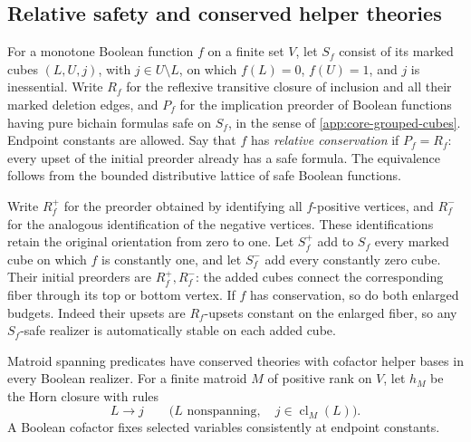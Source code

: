 \subsection{Relative safety and conserved helper theories}
\label{app:core-conservation-closures}

For a monotone Boolean function $f$ on a finite set $V$, let $S_f$ consist
of its marked cubes $(L,U,j)$, with $j\in U\setminus L$, on which
$f(L)=0$, $f(U)=1$, and $j$ is inessential. Write $R_f$ for the reflexive
transitive closure of inclusion and all their marked deletion edges,
and $P_f$ for the implication preorder of Boolean functions
having pure bichain formulas safe on $S_f$, in the sense of
\cref{app:core-grouped-cubes}. Endpoint constants are allowed.
Say that $f$ has \emph{relative conservation} if $P_f=R_f$: every upset of
the initial preorder already has a safe formula. The equivalence follows
from the bounded distributive lattice of safe Boolean functions.

Write $R_f^+$ for the preorder obtained by identifying all $f$-positive
vertices, and $R_f^-$ for the analogous identification of the negative
vertices. These identifications retain the original orientation from zero
to one.
Let $S_f^+$ add to $S_f$ every marked cube on which $f$ is constantly
one, and let $S_f^-$ add every constantly zero cube. Their initial
preorders are $R_f^+,R_f^-$: the added cubes connect the corresponding
fiber through its top or bottom vertex. If $f$ has conservation, so do
both enlarged budgets. Indeed their upsets are $R_f$-upsets constant
on the enlarged fiber, so any $S_f$-safe realizer is automatically
stable on each added cube.

Matroid spanning predicates have conserved theories with cofactor helper
bases in every Boolean realizer. For a finite
matroid $M$ of positive rank on $V$, let $h_M$ be the Horn closure with rules
\[
 L\longrightarrow j\qquad
 \bigl(L\text{ nonspanning},\quad j\in\operatorname{cl}_M(L)\bigr).
\]
A Boolean cofactor fixes selected variables consistently at endpoint constants.

